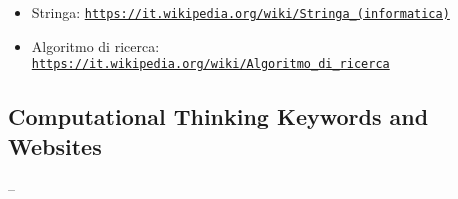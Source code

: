 \documentclass[a4paper,11pt]{report}
\newcommand{\BrochureUrlText}[1]{\texttt{#1}}
\begin{document}
\begin{itemize}
  \item Stringa: \href{https://it.wikipedia.org/wiki/Stringa_(informatica)}{\BrochureUrlText{https://it.wikipedia.org/wiki/Stringa\_(informatica)}}
  \item Algoritmo di ricerca: \href{https://it.wikipedia.org/wiki/Algoritmo_di_ricerca}{\BrochureUrlText{https://it.wikipedia.org/wiki/Algoritmo\_di\_ricerca}}
\end{itemize}


\subsection*{Computational Thinking Keywords and Websites}

–
\end{document}
